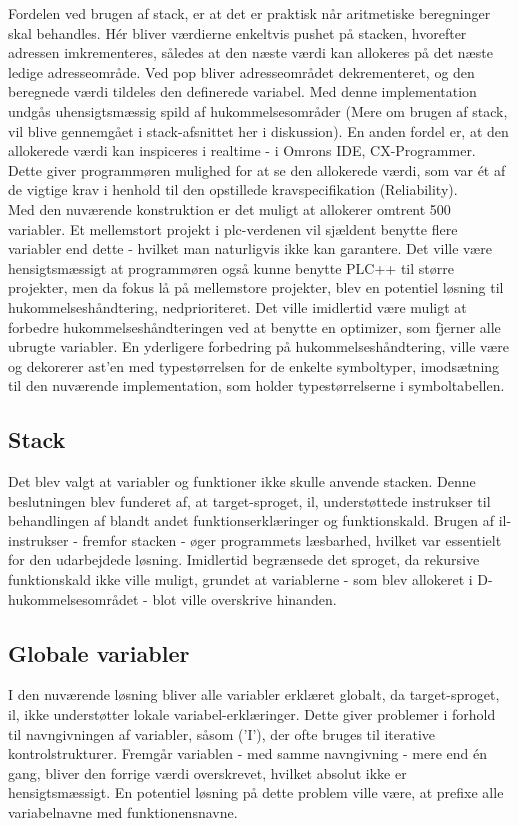\noindent Fordelen ved brugen af stack, er at det er praktisk når aritmetiske beregninger skal behandles. Hér bliver værdierne enkeltvis pushet på stacken, hvorefter adressen imkrementeres, således at den næste værdi kan allokeres på det næste ledige adresseområde. Ved pop bliver adresseområdet dekrementeret, og den beregnede værdi tildeles den definerede variabel. Med denne implementation undgås uhensigtsmæssig spild af hukommelsesområder (Mere om brugen af stack, vil blive gennemgået i stack-afsnittet her i diskussion).
En anden fordel er, at den allokerede værdi kan inspiceres i realtime - i Omrons IDE, CX-Programmer. Dette giver programmøren mulighed for at se den allokerede værdi, som var ét af de vigtige krav i henhold til den opstillede kravspecifikation (Reliability). \\

\noindent Med den nuværende konstruktion er det muligt at allokerer omtrent 500 variabler. Et mellemstort projekt i \gls{plc}-verdenen vil sjældent benytte flere variabler end dette - hvilket man naturligvis ikke kan garantere. Det ville være hensigtsmæssigt at programmøren også kunne benytte PLC++ til større projekter, men da fokus lå på mellemstore projekter, blev en potentiel løsning til hukommelseshåndtering, nedprioriteret.  
Det ville imidlertid være muligt at forbedre hukommelseshåndteringen ved at benytte en optimizer, som fjerner alle ubrugte variabler.   
En yderligere forbedring på hukommelseshåndtering, ville være og dekorerer \gls{ast}'en med typestørrelsen for de enkelte symboltyper, imodsætning til den nuværende implementation, som holder typestørrelserne i symboltabellen.

\subsection*{Stack}
\noindent Det blev valgt at variabler og funktioner ikke skulle anvende stacken. Denne beslutningen blev funderet af, at target-sproget, \gls{il}, understøttede instrukser til behandlingen af blandt andet funktionserklæringer og funktionskald. Brugen af \gls{il}-instrukser - fremfor stacken - øger programmets læsbarhed, hvilket var essentielt for den udarbejdede løsning. Imidlertid begrænsede det sproget, da rekursive funktionskald ikke ville muligt, grundet at variablerne - som blev allokeret i D-hukommelsesområdet - blot ville overskrive hinanden.
\subsection*{Globale variabler}
I den nuværende løsning bliver alle variabler erklæret globalt, da target-sproget, \gls{il}, ikke understøtter lokale variabel-erklæringer. Dette giver problemer i forhold til navngivningen af variabler, såsom ('I'), der ofte bruges til iterative kontrolstrukturer. Fremgår variablen - med samme navngivning - mere end én gang, bliver den forrige værdi overskrevet, hvilket absolut ikke er hensigtsmæssigt. 
En potentiel løsning på dette problem ville være, at prefixe alle variabelnavne med funktionensnavne.









